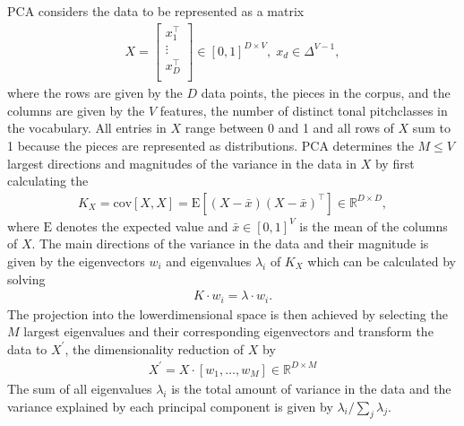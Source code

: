 \documentclass[letterpaper,10pt,english]{sphinxmanual}
\begin{document}
PCA considers the data to be represented as a matrix
\begin{equation*}
\begin{split}X = \left[\begin{array}{c}
               x_1^\top \\
               \vdots \\
               x_D^\top \\
            \end{array}
         \right] \in [0,1]^{D \times V},\;   x_d \in \Delta^{V-1},\end{split}
\end{equation*}
where the rows are given by the \(D\) data points, the pieces in the corpus,
and the columns are given by the \(V\) features, the number of distinct tonal pitch\sphinxhyphen{}classes in the vocabulary.
All entries in \(X\) range between 0 and 1 and all rows of \(X\) sum to 1 because the pieces are represented
as distributions.
PCA determines the \(M\leq V\) largest directions and magnitudes of the variance in the data in \(X\) by first
calculating the 
\begin{equation*}
\begin{split}K_X = \mathrm{cov}[X,X] = \mathrm{E}[(X-\bar{x})(X-\bar{x})^\top] \in\mathbb R^{D\times D},\end{split}
\end{equation*}
where \(\mathrm{E}\) denotes the expected value and \(\bar{x}\in[0,1]^V\) is the mean of the columns of \(X\).
The main directions of the variance in the data and their magnitude is given by the eigenvectors \(w_i\)
and eigenvalues \(\lambda_i\) of \(K_X\) which can be calculated by solving
\begin{equation*}
\begin{split}K \cdot w_i = \lambda \cdot w_i.\end{split}
\end{equation*}
The projection into the lower\sphinxhyphen{}dimensional space is then achieved by selecting the \(M\) largest eigenvalues
and their corresponding eigenvectors and transform the data to \(X^\prime\), the dimensionality reduction of \(X\) by
\begin{equation*}
\begin{split}X^\prime = X \cdot \left[ w_1,        \ldots, w_M \right]\in \mathbb R^{D\times M}\end{split}
\end{equation*}
The sum of all eigenvalues \(\lambda_i\) is the total amount of variance in the data and the variance explained
by each principal component is given by \(\lambda_i / \sum_j \lambda_j\).
\end{document}
